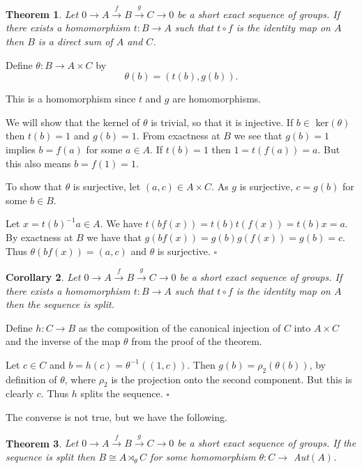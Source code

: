 \documentclass[10pt]{article}
\newtheorem{theorem}{Theorem}[section]
\newtheorem{corollary}[theorem]{Corollary}
\newenvironment{proof}[1][Proof]{\begin{trivlist}
\item[\hskip \labelsep {\itshape #1}]}{\end{trivlist}}
\begin{document}
\begin{theorem}
Let $0 \longrightarrow A \overset{f}{\longrightarrow} B \overset{g}{\longrightarrow} C \longrightarrow 0$ be a short exact sequence of groups. If there exists a homomorphism $t : B \to A$ such that $t\circ f$ is the identity map on $A$ then $B$ is a direct sum of $A$ and $C$.
\end{theorem}

\begin{proof}
Define $\theta : B \to A\times C$ by
$$\theta(b) = (t(b), g(b)).$$

This is a homomorphism since $t$ and $g$ are homomorphisms.

We will show that the kernel of $\theta$ is trivial, so that it is injective. If $b \in$ ker$(\theta)$ then $t(b) = 1$ and $g(b) = 1$. From exactness at $B$ we see that $g(b) = 1$ implies $b = f(a)$ for some $a \in A$. If $t(b) = 1$ then $1 = t(f(a)) = a$. But this also means $b = f(1) = 1$.

To show that $\theta$ is surjective, let $(a, c) \in A\times C$. As $g$ is surjective, $c = g(b)$ for some $b \in B$.

Let $x = t(b)^{-1}a \in A$. We have $t(bf(x)) = t(b)t(f(x)) = t(b)x = a$. By exactness at $B$ we have that $g(bf(x)) = g(b)g(f(x)) = g(b) = c$. Thus $\theta(bf(x)) = (a, c)$ and $\theta$ is surjective. $\square$
\end{proof}

\begin{corollary}
Let $0 \longrightarrow A \overset{f}{\longrightarrow} B \overset{g}{\longrightarrow} C \longrightarrow 0$ be a short exact sequence of groups. If there exists a homomorphism $t : B \to A$ such that $t\circ f$ is the identity map on $A$ then the sequence is split.
\end{corollary}

\begin{proof}
Define $h : C \to B$ as the composition of the canonical injection of $C$ into $A\times C$ and the inverse of the map $\theta$ from the proof of the theorem.

Let $c \in C$ and $b = h(c) = \theta^{-1}((1, c))$. Then $g(b) = \rho_2(\theta(b))$, by definition of $\theta$, where $\rho_2$ is the projection onto the second component. But this is clearly $c$. Thus $h$ splits the sequence. $\square$
\end{proof}

The converse is not true, but we have the following.

\begin{theorem}
Let $0 \longrightarrow A \overset{f}{\longrightarrow} B \overset{g}{\longrightarrow} C \longrightarrow 0$ be a short exact sequence of groups. If the sequence is split then $B \cong A\rtimes_{\theta} C$ for some homomorphism $\theta : C \to$ Aut$(A)$.
\end{theorem}
\end{document}

